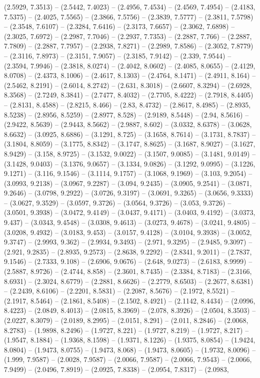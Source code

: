 (2.5929, 7.3513) -- (2.5442, 7.4023) -- (2.4956, 7.4534) -- (2.4569, 7.4954) -- (2.4183, 7.5375) -- (2.4025, 7.5565) -- (2.3866, 7.5756) -- (2.3839, 7.5777) -- (2.3811, 7.5798) -- (2.3548, 7.6107) -- (2.3284, 7.6416) -- (2.3173, 7.6657) -- (2.3062, 7.6898) -- (2.3025, 7.6972) -- (2.2987, 7.7046) -- (2.2937, 7.7353) -- (2.2887, 7.766) -- (2.2887, 7.7809) -- (2.2887, 7.7957) -- (2.2938, 7.8271) -- (2.2989, 7.8586) -- (2.3052, 7.8779) -- (2.3116, 7.8973) -- (2.3151, 7.9057) -- (2.3185, 7.9142) -- (2.339, 7.9544) -- (2.3594, 7.9946) -- (2.3818, 8.0274) -- (2.4042, 8.0602) -- (2.4085, 8.0655) -- (2.4129, 8.0708) -- (2.4373, 8.1006) -- (2.4617, 8.1303) -- (2.4764, 8.1471) -- (2.4911, 8.164) -- (2.5462, 8.2191) -- (2.6014, 8.2742) -- (2.631, 8.3018) -- (2.6607, 8.3294) -- (2.6928, 8.3568) -- (2.7249, 8.3841) -- (2.7477, 8.4032) -- (2.7705, 8.4222) -- (2.7918, 8.4405) -- (2.8131, 8.4588) -- (2.8215, 8.466) -- (2.83, 8.4732) -- (2.8617, 8.4985) -- (2.8935, 8.5238) -- (2.8956, 8.5259) -- (2.8977, 8.528) -- (2.9189, 8.5448) -- (2.94, 8.5616) -- (2.9422, 8.5639) -- (2.9443, 8.5662) -- (2.9887, 8.602) -- (3.0332, 8.6378) -- (3.0628, 8.6632) -- (3.0925, 8.6886) -- (3.1291, 8.725) -- (3.1658, 8.7614) -- (3.1731, 8.7837) -- (3.1804, 8.8059) -- (3.1775, 8.8342) -- (3.1747, 8.8625) -- (3.1687, 8.9027) -- (3.1627, 8.9429) -- (3.158, 8.9725) -- (3.1532, 9.0022) -- (3.1507, 9.0085) -- (3.1481, 9.0149) -- (3.1428, 9.0403) -- (3.1376, 9.0657) -- (3.1334, 9.0826) -- (3.1292, 9.0995) -- (3.1226, 9.1271) -- (3.116, 9.1546) -- (3.1114, 9.1757) -- (3.1068, 9.1969) -- (3.103, 9.2054) -- (3.0993, 9.2138) -- (3.0967, 9.2287) -- (3.094, 9.2435) -- (3.0905, 9.2541) -- (3.0871, 9.2646) -- (3.0798, 9.2922) -- (3.0726, 9.3197) -- (3.0691, 9.3265) -- (3.0656, 9.3333) -- (3.0627, 9.3529) -- (3.0597, 9.3726) -- (3.0564, 9.3726) -- (3.053, 9.3726) -- (3.0501, 9.3938) -- (3.0472, 9.4149) -- (3.0437, 9.4171) -- (3.0403, 9.4192) -- (3.0373, 9.437) -- (3.0343, 9.4548) -- (3.0308, 9.4613) -- (3.0273, 9.4678) -- (3.0241, 9.4805) -- (3.0208, 9.4932) -- (3.0183, 9.453) -- (3.0157, 9.4128) -- (3.0104, 9.3938) -- (3.0052, 9.3747) -- (2.9993, 9.362) -- (2.9934, 9.3493) -- (2.971, 9.3295) -- (2.9485, 9.3097) -- (2.921, 9.2835) -- (2.8935, 9.2573) -- (2.8638, 9.2292) -- (2.8341, 9.2011) -- (2.7837, 9.1546) -- (2.7333, 9.108) -- (2.6906, 9.0676) -- (2.648, 9.0273) -- (2.6183, 8.9999) -- (2.5887, 8.9726) -- (2.4744, 8.858) -- (2.3601, 8.7435) -- (2.3384, 8.7183) -- (2.3166, 8.6931) -- (2.3024, 8.6779) -- (2.2881, 8.6626) -- (2.2779, 8.6503) -- (2.2677, 8.6381) -- (2.2439, 8.6106) -- (2.2201, 8.5831) -- (2.2087, 8.5676) -- (2.1972, 8.5521) -- (2.1917, 8.5464) -- (2.1861, 8.5408) -- (2.1502, 8.4921) -- (2.1142, 8.4434) -- (2.0996, 8.4223) -- (2.0849, 8.4013) -- (2.0815, 8.3969) -- (2.078, 8.3926) -- (2.0504, 8.3503) -- (2.0227, 8.3079) -- (2.0189, 8.2995) -- (2.0151, 8.291) -- (2.011, 8.2846) -- (2.0068, 8.2783) -- (1.9898, 8.2496) -- (1.9727, 8.221) -- (1.9727, 8.219) -- (1.9727, 8.217) -- (1.9547, 8.1884) -- (1.9368, 8.1598) -- (1.9371, 8.1226) -- (1.9375, 8.0854) -- (1.9424, 8.0804) -- (1.9473, 8.0755) -- (1.9473, 8.068) -- (1.9473, 8.0605) -- (1.9732, 8.0096) -- (1.999, 7.9587) -- (2.0028, 7.9587) -- (2.0066, 7.9587) -- (2.0066, 7.9543) -- (2.0066, 7.9499) -- (2.0496, 7.8919) -- (2.0925, 7.8338) -- (2.0954, 7.8317) -- (2.0983, 